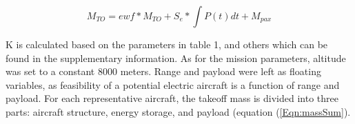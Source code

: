 






\begin{equation}
    M_{TO} = ewf * M_{TO} + S_e * \int P(t) dt  + M_{pax} 
    \label{Eqn:massSum}
\end{equation}

K is calculated based on the parameters in table 1, and others which can be found in the supplementary information. As for the mission parameters, altitude was set to a constant 8000 meters. Range and payload were left as floating variables, as feasibility of a potential electric aircraft is a function of range and payload.
For each representative aircraft, the takeoff mass is divided into three parts: aircraft structure, energy storage, and payload (equation (\ref{Eqn:massSum}).


